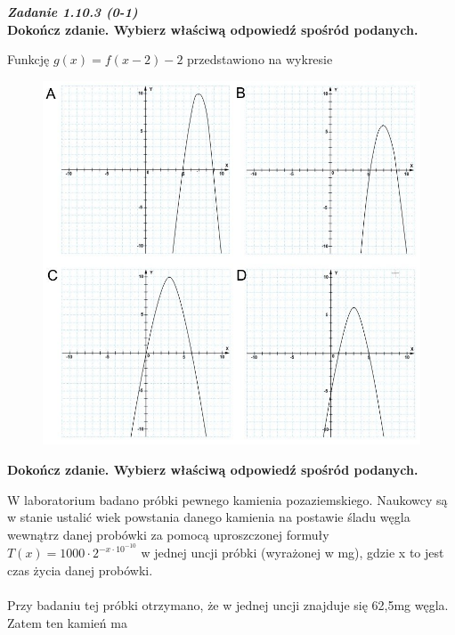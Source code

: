 \documentclass[12pt,a4paper]{article}
\theoremstyle{break}
\begin{document}
		\newpage
		\begin{mdframed}[%
			linecolor=white,%
			innertopmargin=\topskip,
			shadowsize=0,%
			innertopmargin=5,%
			innerbottommargin=5,%
			leftmargin=10,%
			rightmargin=10,%
			backgroundcolor=gray!20,%
			innertopmargin=0pt,]
			\vspace{0.2cm}
			\textbf{\textit{Zadanie 1.10.3 (0-1)}}\\
			\textbf{Dokończ zdanie. Wybierz właściwą odpowiedź spośród podanych.}
			
		\end{mdframed}
	
	Funkcję $g(x)=f(x-2)-2$ przedstawiono na wykresie
	
		\begin{figure}[h]
			\centering
			\includegraphics[scale=0.5]{pm2.jpeg}
		\end{figure}
	
	
	\begin{zad}[0-1]
		\textbf{Dokończ zdanie. Wybierz właściwą odpowiedź spośród podanych.}
	\end{zad} 
	
	W laboratorium badano próbki pewnego kamienia pozaziemskiego. Naukowcy są w stanie ustalić wiek powstania danego kamienia na postawie śladu węgla wewnątrz danej probówki za pomocą uproszczonej formuły $T(x)= 1000\cdot2^{-x \cdot 10^{-10}}$ w jednej uncji próbki (wyrażonej w mg), gdzie x to jest czas życia danej probówki.
	\\\\
	Przy badaniu tej próbki otrzymano, że w jednej uncji znajduje się 62,5mg węgla. Zatem ten kamień ma
	
\end{document}

